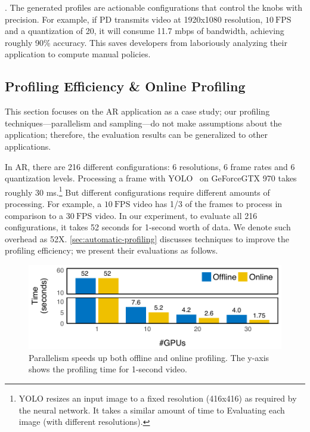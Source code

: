 . The generated profiles are actionable
configurations that control the knobs with precision. For example,
if PD transmits video at 1920x1080 resolution, \(10~\text{FPS}\) and
a quantization of 20, it will consume 11.7 mbps of bandwidth, achieving roughly
90\% accuracy. This saves developers from laboriously analyzing their
application to compute manual policies.

\subsection{Profiling Efficiency \& Online Profiling}
\label{sec:online-profiling}

This section focuses on the AR application as a case study; our profiling
techniques---parallelism and sampling---do not make assumptions about the
application; therefore, the evaluation results can be generalized to other
applications.

In AR, there are 216 different configurations: 6 resolutions, 6 frame rates and
6 quantization levels. Processing a frame with YOLO~\cite{redmon2016yolo9000} on
GeForce\textregistered\space GTX 970 takes roughly 30 ms.\footnote{YOLO resizes
  an input image to a fixed resolution (416x416) as required by the neural
  network. It takes a similar amount of time to Evaluating each image (with
  different resolutions).} But different configurations require different
amounts of processing. For example, a \(10~\text{FPS}\) video has 1/3 of the
frames to process in comparison to a \(30~\text{FPS}\) video.  In our
experiment, to evaluate all 216 configurations, it takes 52 seconds for 1-second
worth of data. We denote such overhead as
52X\@. \autoref{sec:automatic-profiling} discusses techniques to improve the
profiling efficiency; we present their evaluations as follows.

\begin{figure}
  \centering
  \includegraphics[width=1.0\columnwidth]{figures/parallel.pdf}
  \caption{Parallelism speeds up both offline and online profiling.
  The y-axis shows the profiling time for 1-second video.}
  \label{fig:parallel}
\end{figure}

